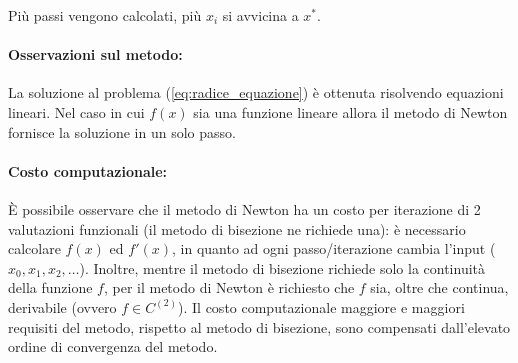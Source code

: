 Più passi vengono calcolati, più $x_i$ si avvicina a $x^*$.

\paragraph{Osservazioni sul metodo:} La soluzione al problema (\ref{eq:radice_equazione}) è ottenuta risolvendo \gls{equazioni lineari}. Nel caso in cui $f(x)$ sia una \gls{funzione lineare} allora il metodo di Newton fornisce la soluzione in un solo passo.

\paragraph{Costo computazionale:}È possibile osservare che il metodo di Newton ha un costo per iterazione di 2 valutazioni funzionali (il metodo di bisezione ne richiede una): è necessario calcolare $f(x)$ ed $f'(x)$, in quanto ad ogni passo/iterazione cambia l'input ($x_0, x_1, x_2, \hdots$).
Inoltre, mentre il metodo di bisezione richiede solo la continuità della funzione $f$, per il metodo di Newton è richiesto che $f$ sia, oltre che continua, derivabile (ovvero $f\in C^{(2)}$).
Il costo computazionale maggiore e maggiori requisiti del metodo, rispetto al metodo di bisezione, sono compensati dall'elevato ordine di convergenza del metodo.

